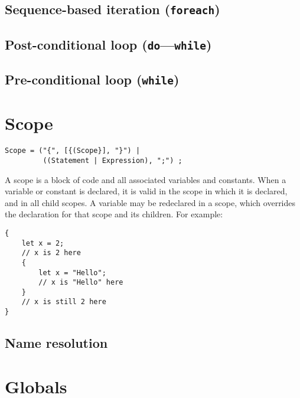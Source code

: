 \documentclass{article}
\begin{document}
\subsection{Sequence-based iteration (\texttt{foreach})}
\label{sub:statements:foreach}

\subsection{Post-conditional loop (\texttt{do}---\texttt{while})}
\label{sub:statements:do}

\subsection{Pre-conditional loop (\texttt{while})}
\label{sub:statements:while}

\section{Scope}
\label{sec:scope}
\begin{verbatim}
Scope = ("{", [{(Scope}], "}") |
         ((Statement | Expression), ";") ;
\end{verbatim}
A scope is a block of code and all associated variables and constants. When a
variable or constant is declared, it is valid in the scope in which it is declared,
and in all child scopes. A variable may be redeclared in a scope, which overrides
the declaration for that scope and its children. For example:
\begin{verbatim}
{
    let x = 2;
    // x is 2 here
    {
        let x = "Hello";
        // x is "Hello" here
    }
    // x is still 2 here
}
\end{verbatim}

\subsection{Name resolution}
\label{sub:scope:resolution}

\section{Globals}
\label{sec:globals}
\end{document}

